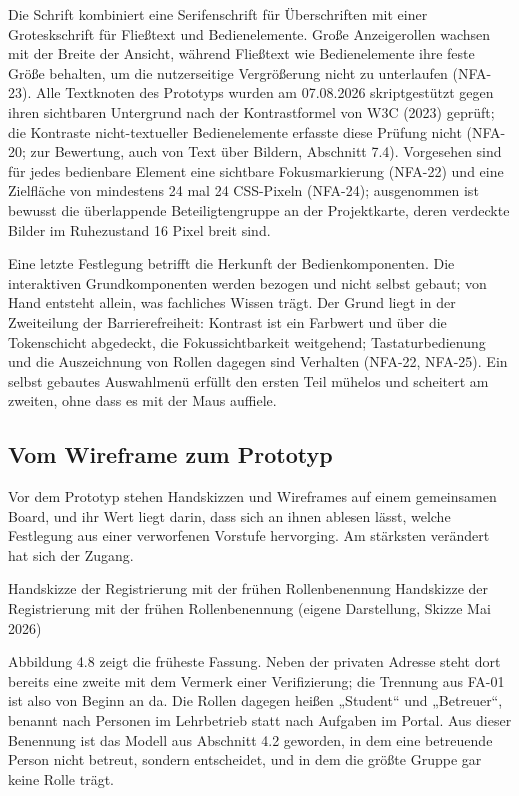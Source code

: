 Die Schrift kombiniert eine Serifenschrift für Überschriften mit einer Groteskschrift für Fließtext und Bedienelemente. Große Anzeigerollen wachsen mit der Breite der Ansicht, während Fließtext wie Bedienelemente ihre feste Größe behalten, um die nutzerseitige Vergrößerung nicht zu unterlaufen (NFA-23). Alle Textknoten des Prototyps wurden am 07.08.2026 skriptgestützt gegen ihren sichtbaren Untergrund nach der Kontrastformel von W3C (2023) geprüft; die Kontraste nicht-textueller Bedienelemente erfasste diese Prüfung nicht (NFA-20; zur Bewertung, auch von Text über Bildern, Abschnitt 7.4). Vorgesehen sind für jedes bedienbare Element eine sichtbare Fokusmarkierung (NFA-22) und eine Zielfläche von mindestens 24 mal 24 CSS-Pixeln (NFA-24); ausgenommen ist bewusst die überlappende Beteiligtengruppe an der Projektkarte, deren verdeckte Bilder im Ruhezustand 16 Pixel breit sind.

Eine letzte Festlegung betrifft die Herkunft der Bedienkomponenten. Die interaktiven Grundkomponenten werden bezogen und nicht selbst gebaut; von Hand entsteht allein, was fachliches Wissen trägt. Der Grund liegt in der Zweiteilung der Barrierefreiheit: Kontrast ist ein Farbwert und über die Tokenschicht abgedeckt, die Fokussichtbarkeit weitgehend; Tastaturbedienung und die Auszeichnung von Rollen dagegen sind Verhalten (NFA-22, NFA-25). Ein selbst gebautes Auswahlmenü erfüllt den ersten Teil mühelos und scheitert am zweiten, ohne dass es mit der Maus auffiele.

\subsection{Vom Wireframe zum Prototyp}

Vor dem Prototyp stehen Handskizzen und Wireframes auf einem gemeinsamen Board, und ihr Wert liegt darin, dass sich an ihnen ablesen lässt, welche Festlegung aus einer verworfenen Vorstufe hervorging. Am stärksten verändert hat sich der Zugang.

%
{Handskizze der Registrierung mit der frühen Rollenbenennung}%
{Handskizze der Registrierung mit der frühen Rollenbenennung (eigene Darstellung, Skizze Mai 2026)}

Abbildung 4.8 zeigt die früheste Fassung. Neben der privaten Adresse steht dort bereits eine zweite mit dem Vermerk einer Verifizierung; die Trennung aus FA-01 ist also von Beginn an da. Die Rollen dagegen heißen „Student“ und „Betreuer“, benannt nach Personen im Lehrbetrieb statt nach Aufgaben im Portal. Aus dieser Benennung ist das Modell aus Abschnitt 4.2 geworden, in dem eine betreuende Person nicht betreut, sondern entscheidet, und in dem die größte Gruppe gar keine Rolle trägt.

